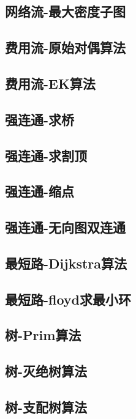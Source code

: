 \documentclass[UTF8]{ctexart}
\begin{document}
\begin{CJK}{UTF8}{<font>}
\begin{spacing}{0.80}
\subsection{网络流-最大密度子图} 
\subsection{费用流-原始对偶算法} 
\subsection{费用流-EK算法} 
\subsection{强连通-求桥} 
\subsection{强连通-求割顶} 
\subsection{强连通-缩点} 
\subsection{强连通-无向图双连通} 
\subsection{最短路-Dijkstra算法} 
\subsection{最短路-floyd求最小环} 
\subsection{树-Prim算法} 
\subsection{树-灭绝树算法} 
\subsection{树-支配树算法} 

\end{spacing}
\end{CJK}
\end{document}
